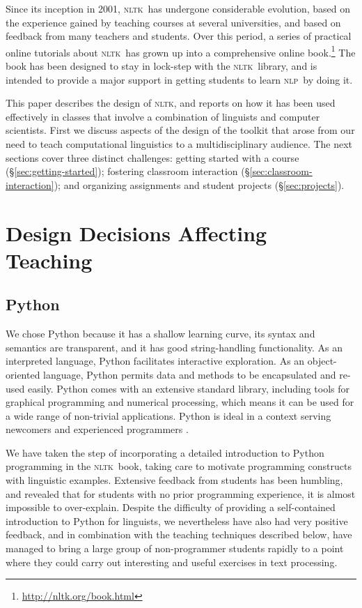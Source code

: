 \documentclass[11pt]{article}
\newcommand{\NLP}{\textsc{nlp}}
\newcommand{\NLTK}{\textsc{nltk}}
\begin{document}
Since its inception in 2001, \NLTK\ has undergone considerable
evolution, based on the experience gained by teaching courses at
several universities, and based on feedback from many teachers and
students.  Over this period, a series of practical online tutorials
about \NLTK\ has grown up into a comprehensive online book.\footnote{\url{http://nltk.org/book.html}}
The book has been designed to stay in lock-step
with the \NLTK\ library, and is intended to provide a major support in
getting students to learn \NLP\ by doing it.

This paper describes the design of \NLTK, and reports on how it has
been used effectively in classes that involve a combination of
linguists and computer scientists.  First we discuss aspects of the
design of the toolkit that arose from our need to teach computational
linguistics to a multidisciplinary audience.  The next sections
cover three distinct challenges:
getting started with a course (\S\ref{sec:getting-started});
fostering classroom interaction (\S\ref{sec:classroom-interaction});
and organizing assignments and student projects (\S\ref{sec:projects}).

\section{Design Decisions Affecting Teaching}
\label{sec:design}

\subsection{Python}

We chose Python because it has a shallow learning curve, its syntax
and semantics are transparent, and it has good string-handling
functionality.  As an interpreted language, Python facilitates
interactive exploration.  As an object-oriented language, Python
permits data and methods to be encapsulated and re-used easily.  Python comes with an extensive
standard library, including tools for graphical programming and
numerical processing, which means it can be used for a wide range
of non-trivial applications.
Python is ideal in a context
serving newcomers and experienced programmers \cite{Shannon03}.

We have taken the step of incorporating a detailed introduction to
Python programming in the \NLTK\ book, taking care to motivate
programming constructs with linguistic examples. Extensive feedback
from students has been humbling, and revealed that for students with
no prior programming experience, it is almost impossible to
over-explain. Despite the difficulty of providing a
self-contained introduction to Python for linguists, we nevertheless
have also had very positive feedback, and in combination with the
teaching techniques described below, have managed to bring a
large group of non-programmer students rapidly to a point where they
could carry out interesting and useful exercises in text processing.
\end{document}

